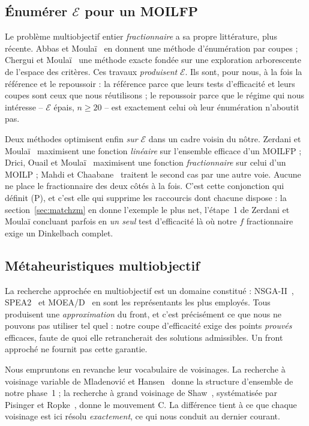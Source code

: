 \documentclass[11pt,a4paper]{article}
\theoremstyle{plain}
\theoremstyle{remark}
\newcommand{\Ecal}{\mathcal{E}}
\begin{document}
\subsection{Énumérer \texorpdfstring{$\Ecal$}{E} pour un MOILFP}

Le problème multiobjectif entier \emph{fractionnaire} a sa propre
littérature, plus récente. Abbas et Moulaï~\cite{abbas2002} en donnent une
méthode d'énumération par coupes ; Chergui et Moulaï~\cite{chergui2008}
une méthode exacte fondée sur une exploration arborescente de l'espace des
critères. Ces travaux \emph{produisent} $\Ecal$. Ils sont, pour nous, à la
fois la référence et le repoussoir : la référence parce que leurs tests
d'efficacité et leurs coupes sont ceux que nous réutilisons ; le repoussoir
parce que le régime qui nous intéresse -- $\Ecal$ épais, $n\ge 20$ -- est
exactement celui où leur énumération n'aboutit pas.

Deux méthodes optimisent enfin \emph{sur} $\Ecal$ dans un cadre voisin du
nôtre. Zerdani et Moulaï~\cite{zerdani2011} maximisent une fonction
\emph{linéaire} sur l'ensemble efficace d'un MOILFP ; Drici, Ouail et
Moulaï~\cite{drici2018} maximisent une fonction \emph{fractionnaire} sur
celui d'un MOILP ; Mahdi et Chaabane~\cite{mahdi2015} traitent le second
cas par une autre voie. Aucune ne place le fractionnaire des deux côtés à
la fois. C'est cette conjonction qui définit (P), et c'est elle qui
supprime les raccourcis dont chacune dispose : la section~\ref{sec:matchzm}
en donne l'exemple le plus net, l'étape~1 de Zerdani et Moulaï concluant
parfois en \emph{un seul} test d'efficacité là où notre $f$ fractionnaire
exige un Dinkelbach complet.

\subsection{Métaheuristiques multiobjectif}

La recherche approchée en multiobjectif est un domaine constitué :
NSGA-II~\cite{deb2002}, SPEA2~\cite{zitzler2001} et MOEA/D~\cite{zhang2007}
en sont les représentants les plus employés. Tous produisent une
\emph{approximation} du front, et c'est précisément ce que nous ne pouvons
pas utiliser tel quel : notre coupe d'efficacité exige des points
\emph{prouvés} efficaces, faute de quoi elle retrancherait des solutions
admissibles. Un front approché ne fournit pas cette garantie.

Nous empruntons en revanche leur vocabulaire de voisinages. La recherche à
voisinage variable de Mladenović et Hansen~\cite{mladenovic1997} donne la
structure d'ensemble de notre phase~1 ; la recherche à grand voisinage de
Shaw~\cite{shaw1998}, systématisée par Pisinger et
Ropke~\cite{pisinger2010}, donne le mouvement C. La différence tient à ce
que chaque voisinage est ici résolu \emph{exactement}, ce qui nous conduit
au dernier courant.
\end{document}

